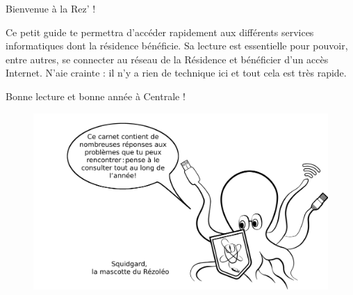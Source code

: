 \documentclass[12pt]{article}
\begin{document}
  \vspace*{0.5cm}
  Bienvenue à la Rez’ ! 
  \newline

  Ce petit guide te permettra d’accéder rapidement aux différents services informatiques dont la résidence bénéficie. Sa lecture est essentielle pour pouvoir, entre autres, se connecter au réseau de la Résidence et bénéficier d’un accès Internet.
  N’aie crainte : il n’y a rien de technique ici et tout cela est très rapide.
  \newline

  Bonne lecture et bonne année à Centrale !  \newline
  \vspace*{3cm}
  \begin{figure}[h!]
    \centerline{\includegraphics[scale=0.13]{imageAccueil.png}}
  \end{figure}

  \newpage
\end{document}
